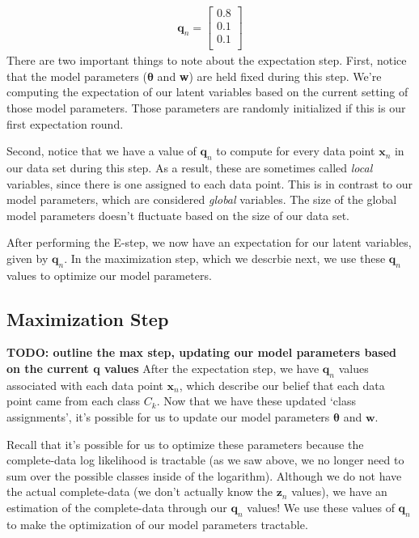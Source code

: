 \begin{align*}
    \textbf{q}_n = \begin{bmatrix}
            0.8 \\
            0.1 \\
            0.1 \\
        \end{bmatrix}
\end{align*}
There are two important things to note about the expectation step. First, notice that the model parameters ($\boldsymbol{\theta}$ and \textbf{w}) are held fixed during this step. We're computing the expectation of our latent variables based on the current setting of those model parameters. Those parameters are randomly initialized if this is our first expectation round.

Second, notice that we have a value of $\textbf{q}_n$ to compute for every data point $\textbf{x}_n$ in our data set during this step. As a result, these are sometimes called \textit{local} variables, since there is one assigned to each data point. This is in contrast to our model parameters, which are considered \textit{global} variables. The size of the global model parameters doesn't fluctuate based on the size of our data set.

After performing the E-step, we now have an expectation for our latent variables, given by $\textbf{q}_n$. In the maximization step, which we descrbie next, we use these $\textbf{q}_n$ values to optimize our model parameters.

\subsection{Maximization Step}
\textbf{TODO: outline the max step, updating our model parameters based on the current q values}
After the expectation step, we have $\textbf{q}_n$ values associated with each data point $\textbf{x}_n$, which describe our belief that each data point came from each class $C_k$. Now that we have these updated `class assignments', it's possible for us to update our model parameters $\boldsymbol{\theta}$ and $\textbf{w}$.

Recall that it's possible for us to optimize these parameters because the complete-data log likelihood is tractable (as we saw above, we no longer need to sum over the possible classes inside of the logarithm). Although we do not have the actual complete-data (we don't actually know the $\textbf{z}_n$ values), we have an estimation of the complete-data through our $\textbf{q}_n$ values! We use these values of $\textbf{q}_n$ to make the optimization of our model parameters tractable.

